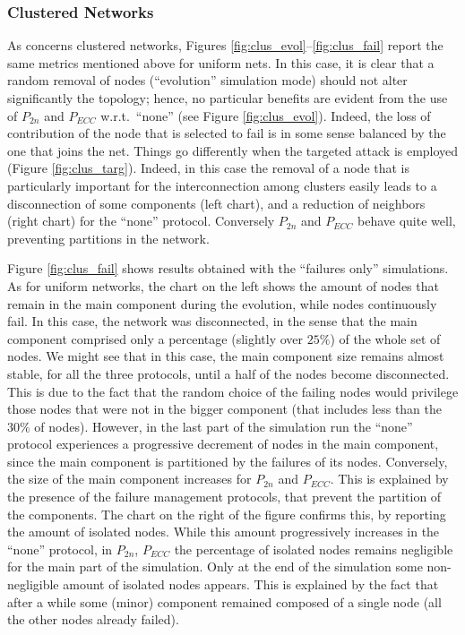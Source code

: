 \documentclass[10pt, conference, compsocconf]{IEEEtran}
\begin{document}
\subsubsection{Clustered Networks}
As concerns clustered networks, Figures \ref{fig:clus_evol}--\ref{fig:clus_fail} report the same metrics mentioned above for uniform nets. In this case, it is clear that a random removal of nodes (``evolution'' simulation mode) should not alter significantly the topology; hence, no particular benefits are evident from the use of $P_{2n}$ and $P_{ECC}$ w.r.t.~``none'' (see Figure \ref{fig:clus_evol}).
Indeed, the loss of contribution of the node that is selected to fail is in some sense balanced by the one that joins the net.
Things go differently when the targeted attack is employed (Figure \ref{fig:clus_targ}). Indeed, in this case the removal of a node that is particularly important for the interconnection among clusters easily leads to a disconnection of some components (left chart), and a reduction of neighbors (right chart) for the ``none'' protocol. Conversely $P_{2n}$ and $P_{ECC}$ behave quite well, preventing partitions in the network.

Figure \ref{fig:clus_fail} shows results obtained with the ``failures only'' simulations. As for uniform networks, the chart on the left shows the amount of nodes that remain in the main component during the evolution, while nodes continuously fail.
In this case, the network was disconnected, in the sense that the main component comprised only a percentage (slightly over $25\%$) of the whole set of nodes.
We might see that in this case, the main component size remains almost stable, for all the three protocols, until a half of the nodes become disconnected. This is due to the fact that the random choice of the failing nodes would privilege those nodes that were not in the bigger component (that includes less than the $30\%$ of nodes). However, in the last part of the simulation run the ``none'' protocol experiences a progressive decrement of nodes in the main component, since the main component is partitioned by the failures of its nodes. Conversely, the size of the main component increases for $P_{2n}$ and $P_{ECC}$. This is explained by the presence of the failure management protocols, that prevent the partition of the components.
The chart on the right of the figure confirms this, by reporting the amount of isolated nodes. While this amount progressively increases in the ``none'' protocol, in $P_{2n}$, $P_{ECC}$ the percentage of isolated nodes remains negligible for the main part of the simulation. Only at the end of the simulation some non-negligible amount of isolated nodes appears. This is explained by the fact that after a while some (minor) component remained composed of a single node (all the other nodes already failed).
\end{document}
